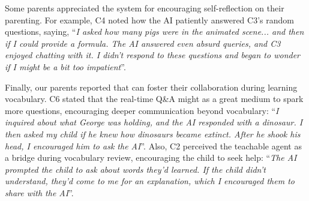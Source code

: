 Some parents appreciated the system for encouraging self-reflection on their parenting. For example, C4 noted how the AI patiently answered C3's random questions, saying, ``\textit{I asked how many pigs were in the animated scene... and then if I could provide a formula. The AI answered even absurd queries, and C3 enjoyed chatting with it. I didn't respond to these questions and began to wonder if I might be a bit too impatient}''.

Finally, our parents reported that \name{} can foster their collaboration during learning vocabulary. C6 stated that the real-time Q\&A might as a great medium to spark more questions, encouraging deeper communication beyond vocabulary: ``\textit{I inquired about what George was holding, and the AI responded with a dinosaur. I then asked my child if he knew how dinosaurs became extinct. After he shook his head, I encouraged him to ask the AI}''. Also, C2 perceived the teachable agent as a bridge during vocabulary review, encouraging the child to seek help: ``\textit{The AI prompted the child to ask about words they'd learned. If the child didn't understand, they'd come to me for an explanation, which I encouraged them to share with the AI}''.